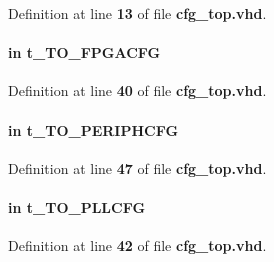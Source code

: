 Definition at line {\bf 13} of file {\bf cfg\+\_\+top.\+vhd}.

\paragraph[{to\+\_\+fpgacfg}]{ {\bfseries \textcolor{keywordflow}{in}\textcolor{vhdlchar}{ }} {\bfseries {\bfseries {\bf t\+\_\+\+T\+O\+\_\+\+F\+P\+G\+A\+C\+FG}} \textcolor{vhdlchar}{ }} \hspace{0.3cm}{\ttfamily [Port]}}\label{classcfg__top_a88dd7483c135b5fb05648743be439a70}


Definition at line {\bf 40} of file {\bf cfg\+\_\+top.\+vhd}.

\paragraph[{to\+\_\+periphcfg}]{ {\bfseries \textcolor{keywordflow}{in}\textcolor{vhdlchar}{ }} {\bfseries {\bfseries {\bf t\+\_\+\+T\+O\+\_\+\+P\+E\+R\+I\+P\+H\+C\+FG}} \textcolor{vhdlchar}{ }} \hspace{0.3cm}{\ttfamily [Port]}}\label{classcfg__top_a73414b3fc1d6116e053856788a7c3808}


Definition at line {\bf 47} of file {\bf cfg\+\_\+top.\+vhd}.

\paragraph[{to\+\_\+pllcfg}]{ {\bfseries \textcolor{keywordflow}{in}\textcolor{vhdlchar}{ }} {\bfseries {\bfseries {\bf t\+\_\+\+T\+O\+\_\+\+P\+L\+L\+C\+FG}} \textcolor{vhdlchar}{ }} \hspace{0.3cm}{\ttfamily [Port]}}\label{classcfg__top_a97fb63e141dc0f1ec9ea06a6f51b12d7}


Definition at line {\bf 42} of file {\bf cfg\+\_\+top.\+vhd}.

